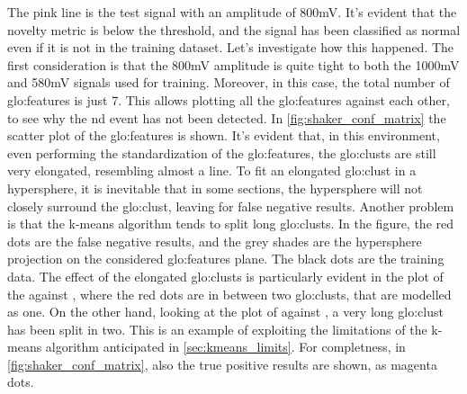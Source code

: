 The pink line is the test signal with an amplitude of 800mV. It's evident that the novelty metric is below the threshold, and the signal has been classified as normal even if it is not in the training dataset. Let's investigate how this happened. The first consideration is that the 800mV amplitude is quite tight to both the 1000mV and 580mV signals used for training. Moreover, in this case, the total number of \gls{glo:feature}s is just 7. This allows plotting all the \gls{glo:feature}s against each other, to see why the \gls{nd} event has not been detected. In \autoref{fig:shaker_conf_matrix} the scatter plot of the \gls{glo:feature}s is shown. It's evident that, in this environment, even performing the standardization of the \gls{glo:feature}s, the \gls{glo:clust}s are still very elongated, resembling almost a line. To fit an elongated \gls{glo:clust} in a hypersphere, it is inevitable that in some sections, the hypersphere will not closely surround the \gls{glo:clust}, leaving  for false negative results. Another problem is that the k-means algorithm tends to split long \gls{glo:clust}s. In the figure, the red dots are the false negative results, and the grey shades are the hypersphere projection on the considered \gls{glo:feature}s plane. The black dots are the training data. The effect of the elongated \gls{glo:clust}s is particularly evident in the plot of the  against , where the red dots are in between two \gls{glo:clust}s, that are modelled as one. On the other hand, looking at the plot of  against , a very long \gls{glo:clust} has been split in two. This is an example of exploiting the limitations of the k-means algorithm anticipated in \autoref{sec:kmeans_limits}. 
For completness, in \autoref{fig:shaker_conf_matrix}, also the true positive results are shown, as magenta dots.


